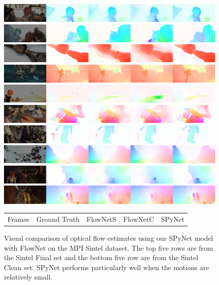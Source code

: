 \documentclass[10pt,twocolumn,letterpaper]{article}
\begin{document}
\begin{figure}
\begin{center}
\includegraphics[width=\linewidth]{final3.jpg}
\includegraphics[width=\linewidth]{final196.jpg}
\includegraphics[width=\linewidth]{final253.jpg}
\includegraphics[width=\linewidth]{final512.jpg}
\includegraphics[width=\linewidth]{final993.jpg}
\includegraphics[width=\linewidth]{clean388.jpg}
\includegraphics[width=\linewidth]{clean562.jpg}
\includegraphics[width=\linewidth]{clean699.jpg}
\includegraphics[width=\linewidth]{clean765.jpg}
\includegraphics[width=\linewidth]{clean818.jpg}
\begin{tabular}{C{0.2\textwidth}C{0.16\textwidth}C{0.16\textwidth}C{0.16\textwidth}C{0.2\textwidth}}
Frames & Ground Truth & FlowNetS & FlowNetC & SPyNet \\
 \end{tabular}
\end{center}
\vspace{-0.1in}
\caption{Visual comparison of optical flow estimates using our  SPyNet model with FlowNet on the MPI Sintel dataset. The top five rows are from the  Sintel Final set and the bottom five row are from the Sintel Clean set.
SPyNet performs particularly well when the motions are relatively small.
}
\label{fig:sintelresults}
\end{figure}
\end{document}

